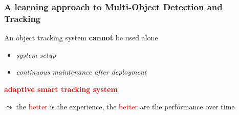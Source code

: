 \begin{frame}
	\frametitle{A learning approach to Multi-Object Detection and Tracking}
	
	{
		\vspace{-2.4cm}
	}
	
	{
		An object tracking system \textbf{cannot} be used alone
		
		\begin{itemize}
			\item \emph{system setup}
			
			\item \emph{continuous maintenance after deployment}
		\end{itemize}
	}
	
	{
		\centering
		
		
		\vspace{-0.4cm}
		
		\begin{center}
			\textcolor{red}{\textbf{adaptive smart tracking system}}
		\end{center}
		
		$ \leadsto $ the \textcolor{red}{better} is the experience, the \textcolor{red}{better} are the performance over time
	}
	
	{
		\vspace{-2.99cm}
	}
\end{frame}
